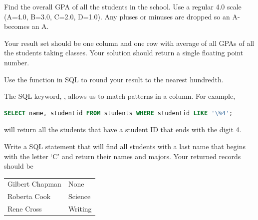 \begin{problem}
Find the overall GPA of all the students in the school.
Use a regular 4.0 scale (A=4.0, B=3.0, C=2.0, D=1.0).
Any pluses or minuses are dropped so an A- becomes an A.

Your result set should be one column and one row with average of all GPAs of all the students taking classes.  
Your solution should return a single floating point number.

Use the  function in SQL to round your result to the nearest hundredth.
\label{prob:studentGPA}
\end{problem}

\begin{problem}
The SQL keyword, , allows us to match patterns in a column.
For example,
\begin{lstlisting}[language=SQL]
SELECT name, studentid FROM students WHERE studentid LIKE '\%4';
\end{lstlisting}
will return all the students that have a student ID that ends with the digit 4.

Write a SQL statement that will find all students with a last name that begins with the letter `C' and return their names and majors.  Your returned records should be
\begin{table}[H]
\begin{tabular}{|l|l|}
\hline
Gilbert Chapman & None \\
Roberta Cook & Science \\
Rene Cross & Writing \\
\hline
\end{tabular}
\label{table:likec_solution}
\end{table}
\label{prob:likec}
\end{problem}

\let\undefined\lsql 
